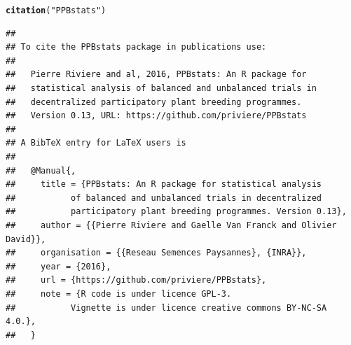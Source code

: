 \documentclass{article}\usepackage[]{graphicx}\usepackage[]{color}
\makeatletter
\newcommand{\hlstr}[1]{\textcolor[rgb]{0.192,0.494,0.8}{#1}}%
\newcommand{\hlstd}[1]{\textcolor[rgb]{0.345,0.345,0.345}{#1}}%
\newcommand{\hlkwd}[1]{\textcolor[rgb]{0.737,0.353,0.396}{\textbf{#1}}}%
\newenvironment{kframe}{%
 \def\at@end@of@kframe{}%
 \ifinner\ifhmode%
  \def\at@end@of@kframe{\end{minipage}}%
  \begin{minipage}{\columnwidth}%
 \fi\fi%
 \def\FrameCommand##1{\hskip\@totalleftmargin \hskip-\fboxsep
 \colorbox{shadecolor}{##1}\hskip-\fboxsep
     \hskip-\linewidth \hskip-\@totalleftmargin \hskip\columnwidth}%
 \MakeFramed {\advance\hsize-\width
   \@totalleftmargin\z@ \linewidth\hsize
   \@setminipage}}%
 {\par\unskip\endMakeFramed%
 \at@end@of@kframe}
\newenvironment{knitrout}{}{} %
\makeatother
\begin{document}
\begin{knitrout}
\color{fgcolor}\begin{kframe}
\begin{alltt}
\hlkwd{citation}\hlstd{(}\hlstr{"PPBstats"}\hlstd{)}
\end{alltt}
\begin{verbatim}
## 
## To cite the PPBstats package in publications use:
## 
##   Pierre Riviere and al, 2016, PPBstats: An R package for
##   statistical analysis of balanced and unbalanced trials in
##   decentralized participatory plant breeding programmes.
##   Version 0.13, URL: https://github.com/priviere/PPBstats
## 
## A BibTeX entry for LaTeX users is
## 
##   @Manual{,
##     title = {PPBstats: An R package for statistical analysis 
##           of balanced and unbalanced trials in decentralized 
##           participatory plant breeding programmes. Version 0.13},
##     author = {{Pierre Riviere and Gaelle Van Franck and Olivier David}},
##     organisation = {{Reseau Semences Paysannes}, {INRA}},
##     year = {2016},
##     url = {https://github.com/priviere/PPBstats},
##     note = {R code is under licence GPL-3. 
##           Vignette is under licence creative commons BY-NC-SA 4.0.},
##   }
\end{verbatim}
\end{kframe}
\end{knitrout}


\end{document}
